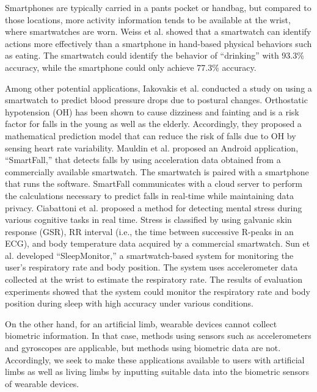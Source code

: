 \documentclass{ieeeaccess}
\begin{document}
Smartphones are typically carried in a pants pocket or handbag, but compared to those locations, more activity information tends to be available at the wrist, where smartwatches are worn. Weiss et al. \cite{smartwatch_activity_recognition} showed that a smartwatch can identify actions more effectively than a smartphone in hand-based physical behaviors such as eating. The smartwatch could identify the behavior of ``drinking'' with 93.3\% accuracy, while the smartphone could only achieve 77.3\% accuracy.\par

Among other potential applications, Iakovakis et al. \cite{oh_detection} conducted a study on using a smartwatch to predict blood pressure drops due to postural changes. Orthostatic hypotension (OH) has been shown to cause dizziness and fainting and is a risk factor for falls in the young as well as the elderly. Accordingly, they proposed a mathematical prediction model that can reduce the risk of falls due to OH by sensing heart rate variability. Mauldin et al. \cite{smartfall} proposed an Android application, ``SmartFall,'' that detects falls by using acceleration data obtained from a commercially available smartwatch. The smartwatch is paired with a smartphone that runs the software. SmartFall communicates with a cloud server to perform the calculations necessary to predict falls in real-time while maintaining data privacy. Ciabattoni et al. \cite{smartwatch_stress_detection} proposed a method for detecting mental stress during various cognitive tasks in real time. Stress is classified by using galvanic skin response (GSR), RR interval (i.e., the time between successive R-peaks in an ECG), and body temperature data acquired by a commercial smartwatch. Sun et al. \cite{SleepMonitor} developed ``SleepMonitor,'' a smartwatch-based system for monitoring the user's respiratory rate and body position. The system uses accelerometer data collected at the wrist to estimate the respiratory rate. The results of evaluation experiments showed that the system could monitor the respiratory rate and body position during sleep with high accuracy under various conditions.\par

On the other hand, for an artificial limb, wearable devices cannot collect biometric information. In that case, methods using sensors such as accelerometers and gyroscopes are applicable, but methods using biometric data are not. Accordingly, we seek to make these applications available to users with artificial limbs as well as living limbs by inputting suitable data into the biometric sensors of wearable devices.
\end{document}
